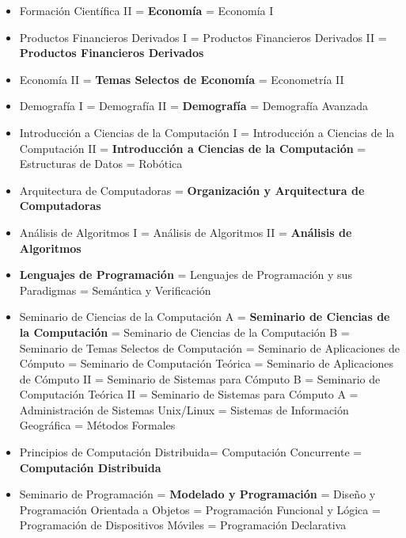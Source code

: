 \begin{itemize}
\item Formación Científica II = \textbf{Economía} = Economía I

\item Productos Financieros Derivados I = Productos Financieros Derivados II = \textbf{Productos Financieros Derivados} 

\item Economía II = \textbf{Temas Selectos de Economía} = Econometría II 

\item Demografía I = Demografía II = \textbf{Demografía} = Demografía Avanzada

\item Introducción a Ciencias de la Computación I = Introducción a Ciencias de la Computación II = \textbf{Introducción a Ciencias de la Computación} = Estructuras de Datos = Robótica

\item Arquitectura de Computadoras = \textbf{Organización y Arquitectura de Computadoras}

\item Análisis de Algoritmos I = Análisis de Algoritmos II = \textbf{Análisis de Algoritmos}

\item \textbf{Lenguajes de Programación} = Lenguajes de Programación y sus Paradigmas = Semántica y Verificación

\item Seminario de Ciencias de la Computación A = \textbf{Seminario de Ciencias de la Computación} = Seminario de Ciencias de la Computación B = Seminario de Temas Selectos de Computación = Seminario de Aplicaciones de Cómputo = Seminario de Computación Teórica = Seminario de Aplicaciones de Cómputo II = Seminario de Sistemas para Cómputo B = Seminario de Computación Teórica II = Seminario de Sistemas para Cómputo A  = Administración de Sistemas Unix/Linux = Sistemas de Información Geográfica = Métodos Formales

\item Principios de Computación Distribuida= Computación Concurrente = \textbf{Computación Distribuida}


\item Seminario de Programación = \textbf{Modelado y Programación} = Diseño y Programación Orientada a Objetos = Programación Funcional y Lógica = Programación de Dispositivos Móviles = Programación Declarativa


\end{itemize}
